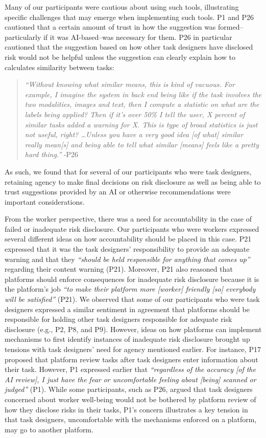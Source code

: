 Many of our participants were cautious about using such tools, illustrating specific challenges that may emerge when implementing such tools. P1 and P26 cautioned that a certain amount of trust in how the suggestion was formed--particularly if it was AI-based--was necessary for them. P26 in particular cautioned that the suggestion based on how other task designers have disclosed risk would not be helpful unless the suggestion can clearly explain how to calculates similarity between tasks: 
\begin{quote}
    \textit{``Without knowing what similar means, this is kind of vacuous. For example, I imagine the system in back end being like if the task involves the two modalities, images and text, then I compute a statistic on what are the labels being applied? Then if it's over 50\% I tell the user, X percent of similar tasks added a warning for X. This is type of broad statistics is just not useful, right? \dots Unless you have a very good idea [of what] similar really mean[s] and being able to tell what similar [means] feels like a pretty hard thing.''} -P26
\end{quote}
As such, we found that for several of our participants who were task designers, retaining agency to make final decisions on risk disclosure as well as being able to trust suggestions provided by an AI or otherwise recommendations were important considerations. 

From the worker perspective, there was a need for accountability in the case of failed or inadequate risk disclosure. Our participants who were workers expressed several different ideas on how accountability should be placed in this case. P21 expressed that it was the task designers' responsibility to provide an adequate warning and that they \textit{``should be held responsible for anything that comes up''} regarding their content warning (P21). Moreover, P21 also reasoned that platforms should enforce consequences for inadequate risk disclosure because it is the platform's job \textit{``to make their platform more [worker] friendly [so] everybody will be satisfied''} (P21). We observed that some of our participants who were task designers expressed a similar sentiment in agreement that platforms should be responsible for holding other task designers responsible for adequate risk disclosure (e.g., P2, P8, and P9). However, ideas on how platforms can implement mechanisms to first identify instances of inadequate risk disclosure brought up tensions with task designers' need for agency mentioned earlier. For instance, P17 proposed that platform review tasks after task designers enter information about their task. However, P1 expressed earlier that \textit{``regardless of the accuracy [of the AI review], I just have the fear or uncomfortable feeling about [being] scanned or judged''} (P1). While some participants, such as P26, argued that task designers concerned about worker well-being would not be bothered by platform review of how they disclose risks in their tasks, P1's concern illustrates a key tension in that task designers, uncomfortable with the mechanisms enforced on a platform, may go to another platform.  

